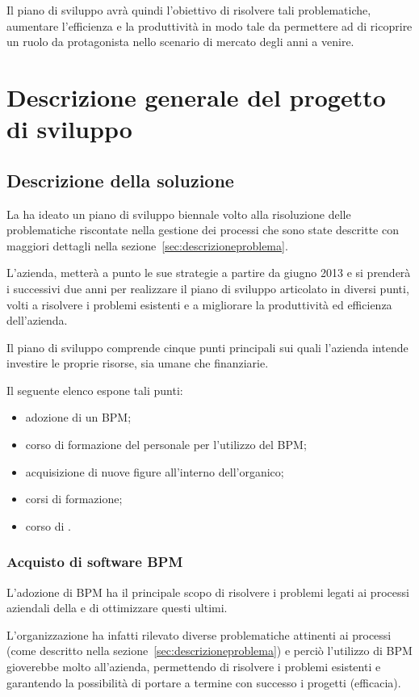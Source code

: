 Il piano di sviluppo avrà quindi l'obiettivo di risolvere tali problematiche, aumentare l'efficienza e la produttività in modo tale da permettere ad \customer di ricoprire un ruolo da protagonista nello scenario di mercato degli anni a venire.

\chapter{Descrizione generale del progetto di sviluppo}

\section{Descrizione della soluzione}
La \customer ha ideato un piano di sviluppo biennale volto alla risoluzione delle problematiche riscontate nella gestione dei processi che sono state descritte con maggiori dettagli nella sezione~\ref{sec:descrizioneproblema}.

L'azienda, metterà a punto le sue strategie a partire da giugno 2013 e si prenderà i successivi due anni per realizzare il piano di sviluppo articolato in diversi punti, volti a risolvere i problemi esistenti e a migliorare la produttività ed efficienza dell'azienda.
		
Il piano di sviluppo comprende cinque punti principali sui quali l'azienda intende investire le proprie risorse, sia umane che finanziarie. 

Il seguente elenco espone tali punti:
	\begin{itemize}
  		\item adozione di un \sw BPM;
       \item corso di formazione del personale per l'utilizzo del \sw BPM;
       \item acquisizione di nuove figure all'interno dell'organico;
       \item corsi di formazione;
        \item corso di .
     \end{itemize}
	
\subsection{Acquisto di software BPM}
 L'adozione di  BPM ha il principale scopo di risolvere i problemi legati ai processi aziendali della \customer e di ottimizzare questi ultimi.
 
L'organizzazione ha infatti rilevato diverse problematiche attinenti ai processi (come descritto nella sezione~\ref{sec:descrizioneproblema}) e perciò l'utilizzo di \sw BPM gioverebbe molto all'azienda, permettendo di risolvere i problemi esistenti e garantendo la possibilità di portare a termine con successo i progetti (efficacia).
 
